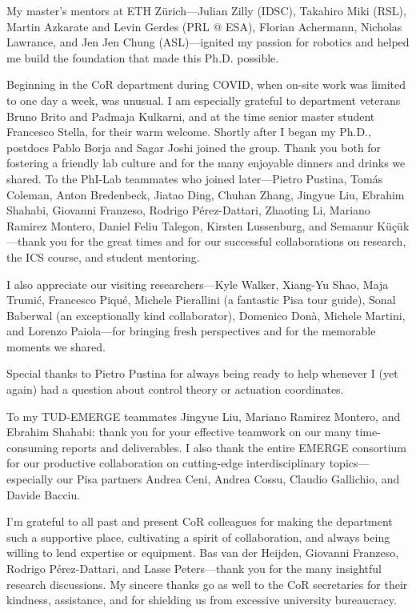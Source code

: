 My master’s mentors at ETH Zürich—Julian Zilly (IDSC), Takahiro Miki (RSL), Martin Azkarate and Levin Gerdes (PRL @ ESA), Florian Achermann, Nicholas Lawrance, and Jen Jen Chung (ASL)—ignited my passion for robotics and helped me build the foundation that made this Ph.D. possible.

Beginning in the CoR department during COVID, when on-site work was limited to one day a week, was unusual. I am especially grateful to department veterans Bruno Brito and Padmaja Kulkarni, and at the time senior master student Francesco Stella, for their warm welcome.
Shortly after I began my Ph.D., postdocs Pablo Borja and Sagar Joshi joined the group. Thank you both for fostering a friendly lab culture and for the many enjoyable dinners and drinks we shared.
To the PhI-Lab teammates who joined later—Pietro Pustina, Tomás Coleman, Anton Bredenbeck, Jiatao Ding, Chuhan Zhang, Jingyue Liu, Ebrahim Shahabi, Giovanni Franzeso, Rodrigo Pérez-Dattari, Zhaoting Li, Mariano Ramirez Montero, Daniel Feliu Talegon, Kirsten Lussenburg, and Semanur Küçük—thank you for the great times and for our successful collaborations on research, the ICS course, and student mentoring.

I also appreciate our visiting researchers—Kyle Walker, Xiang-Yu Shao, Maja Trumić, Francesco Piqué, Michele Pierallini (a fantastic Pisa tour guide), Sonal Baberwal (an exceptionally kind collaborator), Domenico Donà, Michele Martini, and Lorenzo Paiola—for bringing fresh perspectives and for the memorable moments we shared.

Special thanks to Pietro Pustina for always being ready to help whenever I (yet again) had a question about control theory or actuation coordinates.

To my TUD-EMERGE teammates Jingyue Liu, Mariano Ramirez Montero, and Ebrahim Shahabi: thank you for your effective teamwork on our many time-consuming reports and deliverables. I also thank the entire EMERGE consortium for our productive collaboration on cutting-edge interdisciplinary topics—especially our Pisa partners Andrea Ceni, Andrea Cossu, Claudio Gallichio, and Davide Bacciu.

I’m grateful to all past and present CoR colleagues for making the department such a supportive place, cultivating a spirit of collaboration, and always being willing to lend expertise or equipment. Bas van der Heijden, Giovanni Franzeso, Rodrigo Pérez-Dattari, and Lasse Peters—thank you for the many insightful research discussions.
My sincere thanks go as well to the CoR secretaries for their kindness, assistance, and for shielding us from excessive university bureaucracy.

